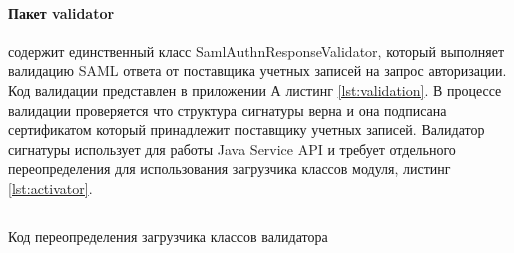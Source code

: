 \paragraph{Пакет validator} содержит единственный класс SamlAuthnResponseValidator, который выполняет валидацию SAML ответа от поставщика учетных записей на запрос авторизации. Код валидации представлен в приложении А  листинг \ref{lst:validation}. В процессе валидации проверяется что структура сигнатуры верна и она подписана сертификатом который принадлежит поставщику учетных записей. Валидатор сигнатуры использует для работы Java Service API и требует отдельного переопределения для использования загрузчика классов модуля, листинг \ref{lst:activator}.

\begin{longlisting}
\inputminted[linenos,frame=single]{java}{inc/src/validatorLoader}
\caption{Код переопределения загрузчика классов валидатора} 
\label{lst:validatorLoader}
\end{longlisting}

